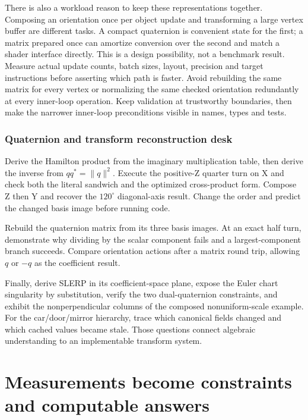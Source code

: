 There is also a workload reason to keep these representations together. Composing an orientation once per object update and transforming a large vertex buffer are different tasks. A compact quaternion is convenient state for the first; a matrix prepared once can amortize conversion over the second and match a shader interface directly. This is a design possibility, not a benchmark result. Measure actual update counts, batch sizes, layout, precision and target instructions before asserting which path is faster. Avoid rebuilding the same matrix for every vertex or normalizing the same checked orientation redundantly at every inner-loop operation. Keep validation at trustworthy boundaries, then make the narrower inner-loop preconditions visible in names, types and tests.

\subsubsection{Quaternion and transform reconstruction desk}\label{quaternion-and-transform-reconstruction-desk}

Derive the Hamilton product from the imaginary multiplication table, then derive the inverse from \(qq^*=\|q\|^2\). Execute the positive-Z quarter turn on X and check both the literal sandwich and the optimized cross-product form. Compose Z then Y and recover the \(120^\circ\) diagonal-axis result. Change the order and predict the changed basis image before running code.

Rebuild the quaternion matrix from its three basis images. At an exact half turn, demonstrate why dividing by the scalar component fails and a largest-component branch succeeds. Compare orientation actions after a matrix round trip, allowing \(q\) or \(-q\) as the coefficient result.

Finally, derive SLERP in its coefficient-space plane, expose the Euler chart singularity by substitution, verify the two dual-quaternion constraints, and exhibit the nonperpendicular columns of the composed nonuniform-scale example. For the car/door/mirror hierarchy, trace which canonical fields changed and which cached values became stale. Those questions connect algebraic understanding to an implementable transform system.

\section{Measurements become constraints and computable answers}\label{measurements-become-constraints-and-computable-answers}

